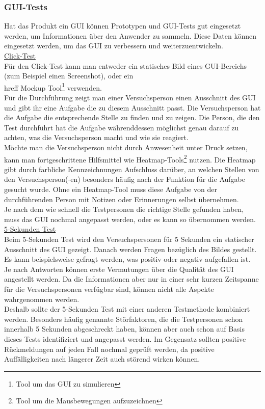 \documentclass[10pt,a4paper]{article}
\begin{document}
\subsubsection{GUI-Tests}
Hat das Produkt ein GUI können Prototypen und GUI-Tests gut eingesetzt werden, um Informationen über den Anwender zu sammeln. Diese Daten können eingesetzt werden, um das GUI zu verbessern und weiterzuentwickeln.
\\\underline{Click-Test}
\\Für den Click-Test kann man entweder ein statisches Bild eines GUI-Bereichs (zum Beispiel einen Screenshot), oder ein \\hreff Mockup Tool\footnote{Tool um das GUI zu simulieren} verwenden.
\\Für die Durchführung zeigt man einer Versuchsperson einen Ausschnitt des GUI und gibt ihr eine Aufgabe die zu diesem Ausschnitt passt. Die Versuchsperson hat die Aufgabe die entsprechende Stelle zu finden und zu zeigen. Die Person, die den Test durchführt hat die Aufgabe währenddessen möglichst genau darauf zu achten, was die Versuchsperson macht und wie sie reagiert. 
\\Möchte man die Versuchsperson nicht durch Anwesenheit unter Druck setzen, kann man fortgeschrittene Hilfsmittel wie Heatmap-Tools\footnote{Tool um die Mausbewegungen aufzuzeichnen} nutzen. Die Heatmap gibt durch farbliche Kennzeichnungen Aufschluss darüber, an welchen Stellen von den Versuchsperson(-en) besonders häufig nach der Funktion für die Aufgabe gesucht wurde. Ohne ein Heatmap-Tool muss diese Aufgabe von der durchführenden Person mit Notizen oder Erinnerungen selbst übernehmen. 
\\Je nach dem wie schnell die Testpersonen die richtige Stelle gefunden haben, muss das GUI nochmal angepasst werden, oder es kann so übernommen werden.
\\\underline{5-Sekunden Test}
\\Beim 5-Sekunden Test wird den Versuchspersonen für 5 Sekunden ein statischer Ausschnitt des GUI gezeigt. Danach werden Fragen bezüglich des Bildes gestellt. Es kann beispielsweise gefragt werden, was positiv oder negativ aufgefallen ist. 
\\Je nach Antworten können erste Vermutungen über die Qualität des GUI angestellt werden. Da die Informationen aber nur in einer sehr kurzen Zeitspanne für die Versuchspersonen verfügbar sind, können nicht alle Aspekte wahrgenommen werden. 
\\Deshalb sollte der 5-Sekunden Test mit einer anderen Testmethode kombiniert werden. Besonders häufig genannte Störfaktoren, die die Testpersonen schon innerhalb 5 Sekunden abgeschreckt haben, können aber auch schon auf Basis dieses Tests identifiziert und angepasst werden. Im Gegensatz sollten positive Rückmeldungen auf jeden Fall nochmal geprüft werden, da positive Auffälligkeiten nach längerer Zeit auch störend wirken können.
\end{document}
